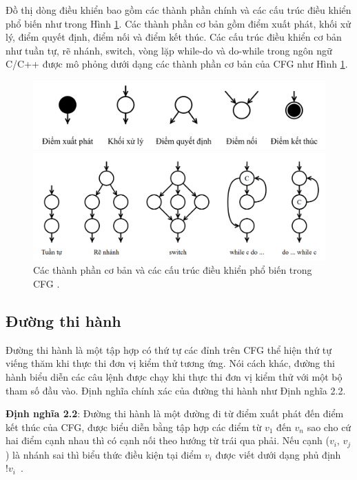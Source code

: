 Đồ thị dòng điều khiển bao gồm các thành phần chính và các cấu trúc điều khiển phổ biến như trong Hình \ref{fig:flow-structure}. Các thành phần cơ bản gồm điểm xuất phát, khối xử lý, điểm quyết định, điểm nối và điểm kết thúc. Các cấu trúc điều khiển cơ bản như tuần tự, rẽ nhánh, switch, vòng lặp while-do và do-while trong ngôn ngữ C/C++ được mô phỏng dưới dạng các thành phần cơ bản của CFG như Hình \ref{fig:flow-structure}.
\begin{figure}[h]
	\centering
	\includegraphics[width=\linewidth]{images/flow-element.png}
		
	\centering
	\includegraphics[width=\linewidth]{images/flow-structure.png}
	\caption{Các thành phần cơ bản và các cấu trúc điều khiển phổ biến trong CFG \cite{GiaoTrinhKiemThu}.}
	\label{fig:flow-structure}
\end{figure}

\subsection{Đường thi hành}\label{sec:path}
Đường thi hành là một tập hợp có thứ tự các đỉnh trên CFG thể hiện thứ tự viếng thăm khi thực thi đơn vị kiểm thử tương ứng. Nói cách khác, đường thi hành biểu diễn các câu lệnh được chạy khi thực thi đơn vị kiểm thử với một bộ tham số đầu vào. Định nghĩa chính xác của đường thi hành như Định nghĩa 2.2.

\textbf{Định nghĩa 2.2}: Đường thi hành là một đường đi từ điểm xuất phát đến điểm kết thúc của CFG, được biểu diễn bằng tập hợp các điểm từ $v_1$ đến $v_n$ sao cho cứ hai điểm cạnh nhau thì có cạnh nối theo hướng từ trái qua phải. Nếu cạnh ($v_i$, $v_j$) là nhánh sai thì biểu thức điều kiện tại điểm $v_i$ được viết dưới dạng phủ định $!v_i$~\cite{GiaoTrinhKiemThu}.

